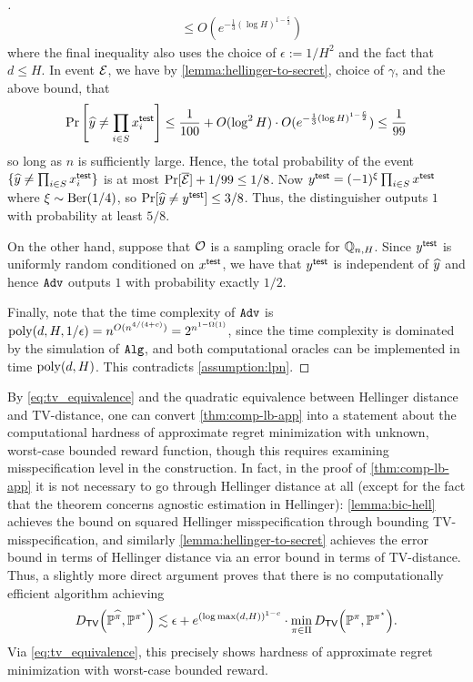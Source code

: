 \begin{proof}[]
\begin{align}
&\leq O(e^{-\frac{1}{3}(\log H)^{1-\frac{c}{2}}})
\end{align}
where the final inequality also uses the choice of $\epsilon := 1/H^2$ and the fact that $d \leq H$. In event $\mathcal{E}$, we have by \cref{lemma:hellinger-to-secret}, choice of $\gamma$, and the above bound, that
\[\operatorname*{Pr}\left[\widehat{y} \neq \prod_{i \in S} x^{\mathsf{test}}_i\right] \leq \frac{1}{100} + O(\log^2 H) \cdot O(e^{-\frac{1}{3}(\log H)^{1-\frac{c}{2}}}) \leq \frac{1}{99}\]
so long as $n$ is sufficiently large. Hence, the total probability of the event $\{\widehat{y} \neq \prod_{i \in S} x^{\mathsf{test}}_i\}$ is at most $\operatorname{Pr}[\overline {\mathcal{E}}] + 1/99 \leq 1/8$. Now $y^{\mathsf{test}} = (-1)^{\xi} \prod_{i \in S} x^{\mathsf{test}}$ where $\xi \sim \mathrm{Ber}(1/4)$, so $\operatorname{Pr}[\widehat{y} \neq y^{\mathsf{test}}] \leq 3/8$. Thus, the distinguisher outputs $1$ with probability at least $5/8$. %

On the other hand, suppose that $\mathcal{O}$ is a sampling oracle for $\mathbb{Q}_{n,H}$. Since $y^{\mathsf{test}}$ is uniformly random conditioned on $x^{\mathsf{test}}$, we have that $y^{\mathsf{test}}$ is independent of $\widehat{y}$ and hence $\texttt{Adv}$ outputs $1$ with probability exactly $1/2$.

Finally, note that the time complexity of $\texttt{Adv}$ is $\mathrm{poly}(d,H,1/\epsilon) = n^{O(n^{4/(4+c)})} = 2^{n^{1-\Omega(1)}}$, since the time complexity is dominated by the simulation of $\texttt{Alg}$, and both computational oracles can be implemented in time $\mathrm{poly}(d,H)$. This contradicts \cref{assumption:lpn}.
\end{proof}

\begin{remark}\label{remark:il-hardness}
By \cref{eq:tv_equivalence} and the quadratic equivalence between Hellinger distance and TV-distance, one can convert \cref{thm:comp-lb-app}
into a statement about the computational hardness of approximate regret minimization with unknown, worst-case bounded reward function, though this requires examining misspecification level in the construction. In fact, in the proof of \cref{thm:comp-lb-app} it is not necessary to go through Hellinger distance at all (except for the fact that the theorem concerns agnostic estimation in Hellinger): \cref{lemma:bic-hell} achieves the bound on squared Hellinger misspecification through bounding TV-misspecification, and similarly \cref{lemma:hellinger-to-secret} achieves the error bound in terms of Hellinger distance via an error bound in terms of TV-distance. Thus, a slightly more direct argument proves that there is no computationally efficient algorithm achieving  \[\Dtv{\BP^{\pihat}}{\BP^{\pistar}} \lesssim \epsilon + e^{(\log \max(d,H))^{1-c}} \cdot \min_{\pi \in \Pi} \Dtv{\BP^\pi}{\BP^{\pistar}}.\]
Via \cref{eq:tv_equivalence}, this precisely shows hardness of approximate regret minimization with worst-case bounded reward.
\end{remark}
